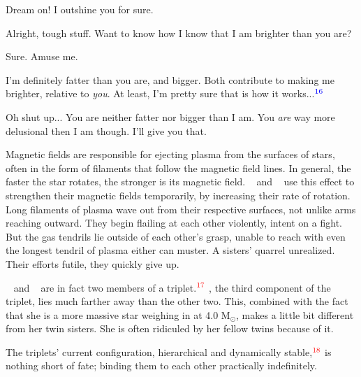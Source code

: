 \documentclass[main.tex]{subfiles}
\begin{document}
\par \Alcyone Dream on!  I outshine you for sure.

\par \Taygete Alright, tough stuff.  Want to know how I know that I am brighter than you are?

\par \Alcyone Sure.  Amuse me.

\par \Taygete I'm definitely fatter than you are, and bigger.  Both contribute to making me brighter, relative to \textit{you}.  At least, I'm pretty sure that is how it works...$^{\textcolor{blue}{16}}$



\par \Alcyone Oh shut up...  You are neither fatter nor bigger than I am.  You \textit{are} way more delusional then I am though.  I'll give you that.

\par \nar Magnetic fields are responsible for ejecting plasma from the surfaces of stars, often in the form of filaments that follow the magnetic field lines.  In general, the faster the star rotates, the stronger is its magnetic field.  \rmtaygete~ and \rmalcyone~ use this effect to strengthen their magnetic fields temporarily, by increasing their rate of rotation.  Long filaments of plasma wave out from their respective surfaces, not unlike arms reaching outward.  They begin flailing at each other violently, intent on a fight.  But the gas tendrils lie outside of each other's grasp, unable to reach with even the longest tendril of plasma either can muster.  A sisters' quarrel unrealized.  Their efforts futile, they quickly give up.  

\par \nar \rmtaygete~ and \rmalcyone~ are in fact two members of a triplet.$^{\textcolor{red}{17}}$  \rmcelaeno, the third component of the triplet, lies much farther away than the other two.  This, combined with the fact that she is a more massive star weighing in at 4.0 M$_{\odot}$, makes \rmcelaeno a little bit different from her twin sisters.  She is often ridiculed by her fellow twins because of it.

\par \nar The triplets' current configuration, hierarchical and dynamically stable,$^{\textcolor{red}{18}}$ is nothing short of fate; binding them to each other practically indefinitely.
\end{document}
